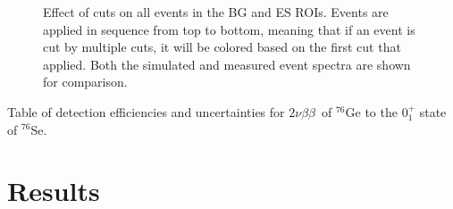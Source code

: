 \documentclass[notitlepage,rmp,aps,10pt]{revtex4-1}
\newcommand{\tnbb}{${2 \nu \beta \beta}$}
\newcommand{\iso}[2]{$^{#1}$#2}
\newcommand{\Ge}[1]{\iso{#1}{Ge}}
\newcommand{\Se}[1]{\iso{#1}{Se}}
\newcommand{\SP}[3]{$#1^{#2}_{#3}$}
\begin{document}
\begin{figure}
  \centering
  \caption[Effect of data cuts on ROI events in measured and simulated data]{\label{fig:cutsroi}
    Effect of cuts on all events in the BG and ES ROIs. Events are applied in sequence from top to bottom, meaning that if an event is cut by multiple cuts, it will be colored based on the first cut that applied. Both the simulated and measured event spectra are shown for comparison.
  }
\end{figure}

\begin{table}
  \centering
  
  \caption[Detection efficiency summary for \tnbb\ to the \SP{0}{+}{1} state of \Se{76}]{\label{tab:bgcutstable}
    Table of detection efficiencies and uncertainties for \tnbb\ of \Ge{76} to the \SP{0}{+}{1} state of \Se{76}.
  }
\end{table}

\section{Results}
\end{document}
